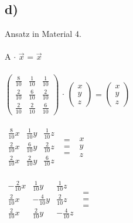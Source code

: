 \documentclass{article}
\begin{document}
	\subsection*{d)}
	Ansatz in Material 4. \\ \\
	A $\cdot$ $\vec{x}$ = $\vec{x}$ \\ \\
	$\left(\begin{array}{ccc}
	\frac{8}{10} & \frac{1}{10} & \frac{1}{10} \\ \frac{2}{10} & \frac{6}{10} & \frac{2}{10} \\ \frac{2}{10} & \frac{2}{10} &\frac{6}{10}
	\end{array}\right)$ $\cdot$
	$\left(\begin{array}{c}
	x \\ y \\ z
	\end{array}\right)$
	= 
	$\left(\begin{array}{c}
	x \\ y \\ z
	\end{array}\right)$ \\ \\
	$\begin{array}{ccc}
	\frac{8}{10}x & \frac{1}{10}y & \frac{1}{10}z \\ \frac{2}{10}x & \frac{6}{10}y & \frac{2}{10}z \\ \frac{2}{10}x & \frac{2}{10}y &\frac{6}{10}z
	\end{array}$
	$\begin{array}{c}
		= \\ = \\ = 
	\end{array}$
	$\begin{array}{c}
	x \\ y \\ z
	\end{array}$ \\ \\
	$\begin{array}{ccc}
	-\frac{2}{10}x & \frac{1}{10}y & \frac{1}{10}z \\ \frac{2}{10}x & -\frac{4}{10}y & \frac{2}{10}z \\ \frac{2}{10}x & \frac{2}{10}y &-\frac{4}{10}z
	\end{array}$
	$\begin{array}{c}
	= \\ = \\ = 
	\end{array}$
\end{document}
